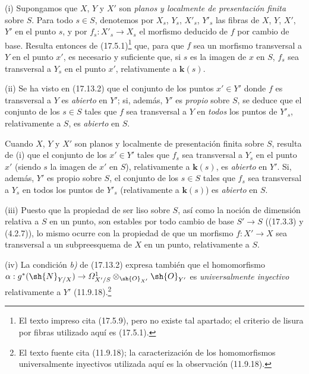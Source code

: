 \begin{remarks}[17.13.4]
\label{IV.17.13.4}
(i) Supongamos que $X$, $Y$ y $X'$ son \emph{planos y localmente de presentación finita} sobre $S$. Para todo $s\in S$, denotemos por $X_s$, $Y_s$, $X'_s$, $Y'_s$ las fibras de $X$, $Y$, $X'$, $Y'$ en el punto $s$, y por $f_s:X'_s\to X_s$ el morfismo deducido de $f$ por cambio de base. Resulta entonces de (17.5.1)\footnote{El texto impreso cita (17.5.9), pero no existe tal apartado; el criterio de lisura por fibras utilizado aquí es (17.5.1).} que, para que $f$ sea un morfismo transversal a $Y$ en el punto $x'$, es necesario y suficiente que, si $s$ es la imagen de $x$ en $S$, $f_s$ sea transversal a $Y_s$ en el punto $x'$, relativamente a $\boldsymbol k(s)$.

(ii) Se ha visto en (17.13.2) que el conjunto de los puntos $x'\in Y'$ donde $f$ es transversal a $Y$ es \emph{abierto} en $Y'$; si, además, $Y'$ es \emph{propio} sobre $S$, se deduce que el conjunto de los $s\in S$ tales que $f$ sea transversal a $Y$ en \emph{todos} los puntos de $Y'_s$, relativamente a $S$, es \emph{abierto} en $S$.

Cuando $X$, $Y$ y $X'$ son planos y localmente de presentación finita sobre $S$, resulta de (i) que el conjunto de los $x'\in Y'$ tales que $f_s$ sea transversal a $Y_s$ en el punto $x'$ (siendo $s$ la imagen de $x'$ en $S$), relativamente a $\boldsymbol k(s)$, es \emph{abierto} en $Y'$. Si, además, $Y'$ es propio sobre $S$, el conjunto de los $s\in S$ tales que $f_s$ sea transversal a $Y_s$ en todos los puntos de $Y'_s$ (relativamente a $\boldsymbol k(s)$) es \emph{abierto} en $S$.

(iii) Puesto que la propiedad de ser liso sobre $S$, así como la noción de dimensión relativa a $S$ en un punto, son estables por todo cambio de base $S'\to S$ ((17.3.3) y (4.2.7)), lo mismo ocurre con la propiedad de que un morfismo $f:X'\to X$ sea transversal a un subpreesquema de $X$ en un punto, relativamente a $S$.


(iv) La condición \emph{b)} de (17.13.2) expresa también que el homomorfismo $\alpha:g^*(\sh{N}_{Y/X})\to\varOmega^1_{X'/S}\otimes_{\sh{O}_{X'}}\sh{O}_{Y'}$ es \emph{universalmente inyectivo} relativamente a $Y'$ (11.9.18).\footnote{El texto fuente cita (11.9.18); la caracterización de los homomorfismos universalmente inyectivos utilizada aquí es la observación (11.9.18).}
\end{remarks}

